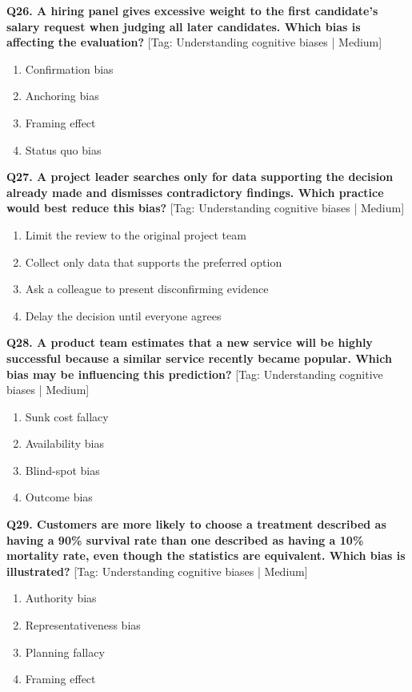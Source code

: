 \noindent\textbf{Q26. A hiring panel gives excessive weight to the first candidate's salary request when judging all later candidates. Which bias is affecting the evaluation?} \hfill [Tag: Understanding cognitive biases | Medium]
\begin{enumerate}[label=(\alph*),topsep=2pt,itemsep=1pt,partopsep=0pt,parsep=0pt]
    \item {Confirmation bias}
    \item {Anchoring bias}
    \item {Framing effect}
    \item {Status quo bias}
\end{enumerate}
\vspace{2mm}

\noindent\textbf{Q27. A project leader searches only for data supporting the decision already made and dismisses contradictory findings. Which practice would best reduce this bias?} \hfill [Tag: Understanding cognitive biases | Medium]
\begin{enumerate}[label=(\alph*),topsep=2pt,itemsep=1pt,partopsep=0pt,parsep=0pt]
    \item {Limit the review to the original project team}
    \item {Collect only data that supports the preferred option}
    \item {Ask a colleague to present disconfirming evidence}
    \item {Delay the decision until everyone agrees}
\end{enumerate}
\vspace{2mm}

\noindent\textbf{Q28. A product team estimates that a new service will be highly successful because a similar service recently became popular. Which bias may be influencing this prediction?} \hfill [Tag: Understanding cognitive biases | Medium]
\begin{enumerate}[label=(\alph*),topsep=2pt,itemsep=1pt,partopsep=0pt,parsep=0pt]
    \item {Sunk cost fallacy}
    \item {Availability bias}
    \item {Blind-spot bias}
    \item {Outcome bias}
\end{enumerate}
\vspace{2mm}

\noindent\textbf{Q29. Customers are more likely to choose a treatment described as having a 90\% survival rate than one described as having a 10\% mortality rate, even though the statistics are equivalent. Which bias is illustrated?} \hfill [Tag: Understanding cognitive biases | Medium]
\begin{enumerate}[label=(\alph*),topsep=2pt,itemsep=1pt,partopsep=0pt,parsep=0pt]
    \item {Authority bias}
    \item {Representativeness bias}
    \item {Planning fallacy}
    \item {Framing effect}
\end{enumerate}
\vspace{2mm}

